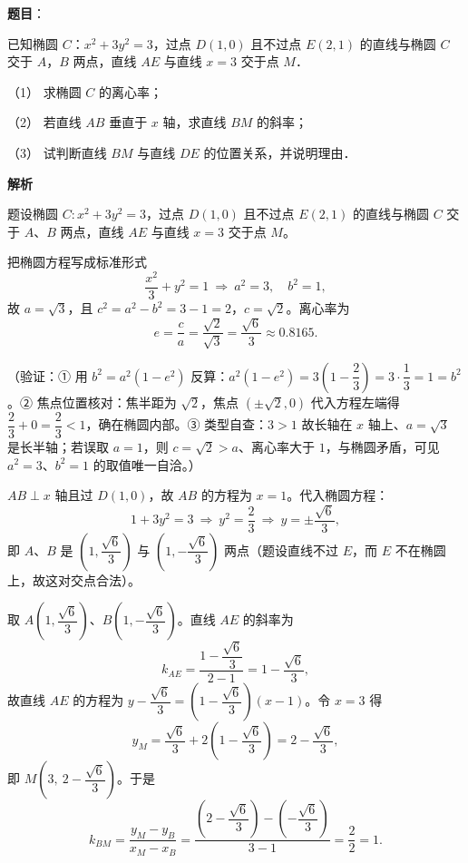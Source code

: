 \begin{answer}

\textbf{题目}：

已知椭圆 \(C\)：\(x^{2}+3y^{2}=3\)，过点 \(D(1,0)\) 且不过点 \(E(2,1)\) 的直线与椭圆 \(C\) 交于 \(A\)，\(B\) 两点，直线 \(AE\) 与直线 \(x=3\) 交于点 \(M\)．

（1） 求椭圆 \(C\) 的离心率；

（2） 若直线 \(AB\) 垂直于 \(x\) 轴，求直线 \(BM\) 的斜率；

（3） 试判断直线 \(BM\) 与直线 \(DE\) 的位置关系，并说明理由．

\textbf{解析}

题设椭圆 \(C:x^{2}+3y^{2}=3\)，过点 \(D(1,0)\) 且不过点 \(E(2,1)\) 的直线与椭圆 \(C\) 交于 \(A\)、\(B\) 两点，直线 \(AE\) 与直线 \(x=3\) 交于点 \(M\)。


把椭圆方程写成标准形式
\nopagebreak[4]
\[
\frac{x^{2}}{3}+y^{2}=1\ \Longrightarrow\ a^{2}=3,\quad b^{2}=1,
\]
故 \(a=\sqrt{3}\)，且 \(c^{2}=a^{2}-b^{2}=3-1=2\)，\(c=\sqrt{2}\)。离心率为
\nopagebreak[4]
\[
e=\frac{c}{a}=\frac{\sqrt{2}}{\sqrt{3}}=\frac{\sqrt{6}}{3}\approx0.8165 .
\]

（验证：① 用 \(b^{2}=a^{2}\left(1-e^{2}\right)\) 反算：\(a^{2}\left(1-e^{2}\right)=3\left(1-\dfrac{2}{3}\right)=3\cdot\dfrac{1}{3}=1=b^{2}\)。② 焦点位置核对：焦半距为 \(\sqrt{2}\)，焦点 \((\pm\sqrt{2},0)\) 代入方程左端得 \(\dfrac{2}{3}+0=\dfrac{2}{3}<1\)，确在椭圆内部。③ 类型自查：\(3>1\) 故长轴在 \(x\) 轴上、\(a=\sqrt{3}\) 是长半轴；若误取 \(a=1\)，则 \(c=\sqrt{2}>a\)、离心率大于 \(1\)，与椭圆矛盾，可见 \(a^{2}=3\)、\(b^{2}=1\) 的取值唯一自洽。）


\(AB\perp x\) 轴且过 \(D(1,0)\)，故 \(AB\) 的方程为 \(x=1\)。代入椭圆方程：
\nopagebreak[4]
\[
1+3y^{2}=3\ \Longrightarrow\ y^{2}=\frac{2}{3}\ \Longrightarrow\ y=\pm\frac{\sqrt{6}}{3},
\]
即 \(A\)、\(B\) 是 \(\left(1,\dfrac{\sqrt{6}}{3}\right)\) 与 \(\left(1,-\dfrac{\sqrt{6}}{3}\right)\) 两点（题设直线不过 \(E\)，而 \(E\) 不在椭圆上，故这对交点合法）。

取 \(A\left(1,\dfrac{\sqrt{6}}{3}\right)\)、\(B\left(1,-\dfrac{\sqrt{6}}{3}\right)\)。直线 \(AE\) 的斜率为
\nopagebreak[4]
\[
k_{AE}=\frac{1-\dfrac{\sqrt{6}}{3}}{2-1}=1-\frac{\sqrt{6}}{3},
\]
故直线 \(AE\) 的方程为 \(y-\dfrac{\sqrt{6}}{3}=\left(1-\dfrac{\sqrt{6}}{3}\right)(x-1)\)。令 \(x=3\) 得
\nopagebreak[4]
\[
y_{M}=\frac{\sqrt{6}}{3}+2\left(1-\frac{\sqrt{6}}{3}\right)=2-\frac{\sqrt{6}}{3},
\]
即 \(M\left(3,\ 2-\dfrac{\sqrt{6}}{3}\right)\)。于是
\nopagebreak[4]
\[
k_{BM}=\frac{y_{M}-y_{B}}{x_{M}-x_{B}}=\frac{\left(2-\dfrac{\sqrt{6}}{3}\right)-\left(-\dfrac{\sqrt{6}}{3}\right)}{3-1}=\frac{2}{2}=1 .
\]


\end{answer}

